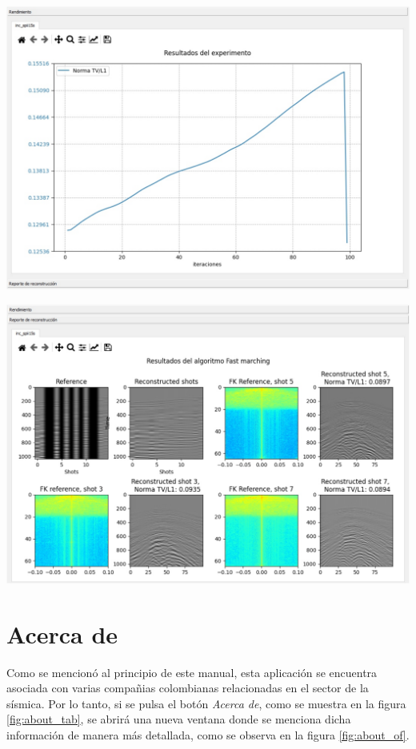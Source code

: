 \documentclass[12pt,twoside,letter]{ol-softwaremanual}
\newenvironment{Figure}
  {\par\medskip\noindent\minipage{\linewidth}}
  {\endminipage\par\medskip}
\begin{document}
\begin{Figure}
	\centering
	\includegraphics[width=0.85\linewidth]{incrd}
	\label{fig:res-incompletosrd}
\end{Figure}

\begin{Figure}
	\centering
	\includegraphics[width=0.85\linewidth]{incrd2}
	\label{fig:res-incompletos2rd}
\end{Figure}

\cleardoublepage

\section{Acerca de}

Como se mencionó al principio de este manual, esta aplicación se encuentra asociada con varias compañias colombianas relacionadas en el sector de la sísmica. Por lo tanto, si se pulsa el botón \emph{Acerca de}, como se muestra en la figura \ref{fig:about_tab}, se abrirá una nueva ventana donde se menciona dicha información de manera más detallada, como se observa en la figura \ref{fig:about_of}.
\end{document}
